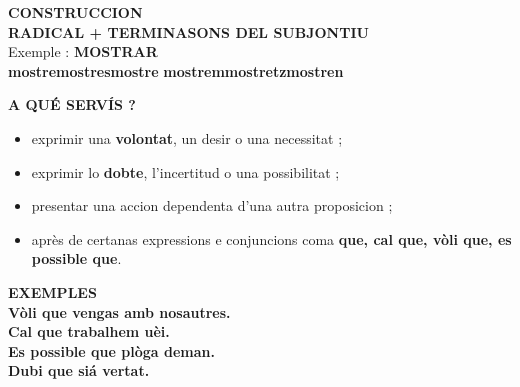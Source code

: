 \documentclass[a4paper,11pt]{article}
\begin{document}
\vspace{2.5mm}\hspace*{6mm}
\begin{minipage}{0.91\textwidth}

\begin{greenbox}
\textbf{\color{GreenDark}CONSTRUCCION}\\[1mm]
\centering
{\Large \textbf{RADICAL + TERMINASONS DEL SUBJONTIU}}\\[1mm]
\small
Exemple : \textbf{MOSTRAR}\\[1mm]
\textbf{mostre}\quad \textbf{mostres}\quad \textbf{mostre}\quad
\textbf{mostrem}\quad \textbf{mostretz}\quad \textbf{mostren}
\end{greenbox}

\vspace{2.5mm}
\begin{center}
\end{center}

\vspace{1.5mm}
\begin{greenbox}
\textbf{\color{GreenDark}A QUÉ SERVÍS ?}\\[1mm]
\begin{itemize}\setlength{\itemsep}{0.4mm}
\item exprimir una \textbf{volontat}, un desir o una necessitat ;
\item exprimir lo \textbf{dobte}, l'incertitud o una possibilitat ;
\item presentar una accion dependenta d'una autra proposicion ;
\item après de certanas expressions e conjuncions coma \textbf{que, cal que, vòli que, es possible que}.
\end{itemize}
\end{greenbox}

\vspace{2mm}
\begin{greenbox}
\textbf{\color{GreenDark}EXEMPLES}\\[1mm]
\textbf{Vòli que vengas amb nosautres.}\\
\textbf{Cal que trabalhem uèi.}\\
\textbf{Es possible que plòga deman.}\\
\textbf{Dubi que siá vertat.}
\end{greenbox}


\end{minipage}
\end{document}
